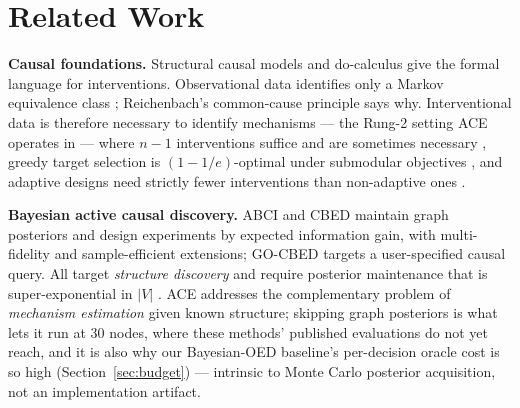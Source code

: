 \documentclass[twoside]{article}
\theoremstyle{plain}
\theoremstyle{definition}
\theoremstyle{remark}
\begin{document}
\section{Related Work}
\label{sec:related}

\textbf{Causal foundations.} Structural causal models and do-calculus \citep{pearl2009causality,pearl1995causal} give the formal language for interventions. Observational data identifies only a Markov equivalence class \citep{spirtes2000causation}; Reichenbach's common-cause principle \citep{reichenbach1956} says why. Interventional data is therefore necessary to identify mechanisms \citep{peters2017elements} --- the Rung-2 setting ACE operates in --- where $n-1$ interventions suffice and are sometimes necessary \citep{eberhardt2005number,eberhardt2006n}, greedy target selection is $(1-1/e)$-optimal under submodular objectives \citep{shanmugam2015learning}, and adaptive designs need strictly fewer interventions than non-adaptive ones \citep{hauser2012characterization,cho2016reconstructing}.

\textbf{Bayesian active causal discovery.} ABCI \citep{toth2022active} and CBED \citep{tigas2022interventions} maintain graph posteriors and design experiments by expected information gain, with multi-fidelity \citep{zhang2023bayesian} and sample-efficient \citep{zhou2024sample} extensions; GO-CBED \citep{zhang2025gocbed} targets a user-specified causal query. All target \emph{structure discovery} and require posterior maintenance that is super-exponential in $|V|$ \citep{chickering1996learning}. ACE addresses the complementary problem of \emph{mechanism estimation} given known structure; skipping graph posteriors is what lets it run at 30 nodes, where these methods' published evaluations do not yet reach, and it is also why our Bayesian-OED baseline's per-decision oracle cost is so high (Section~\ref{sec:budget}) --- intrinsic to Monte Carlo posterior acquisition, not an implementation artifact.
\end{document}
